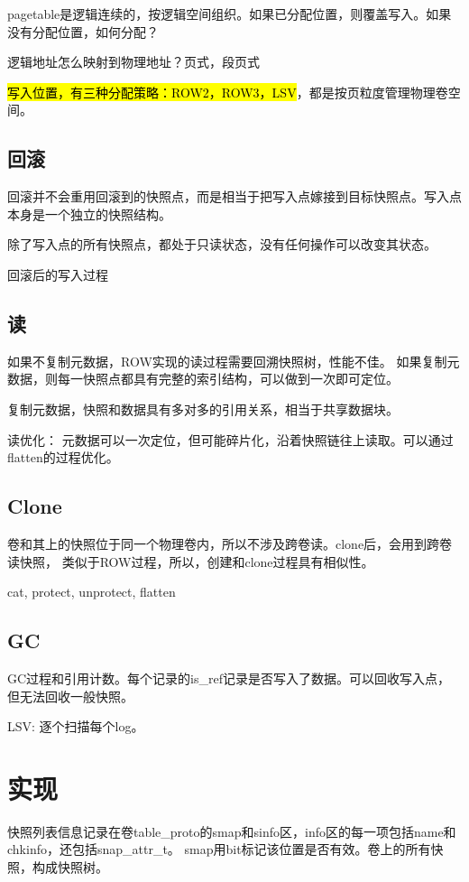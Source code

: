 pagetable是逻辑连续的，按逻辑空间组织。如果已分配位置，则覆盖写入。如果没有分配位置，如何分配？

逻辑地址怎么映射到物理地址？页式，段页式

\hl{写入位置，有三种分配策略：ROW2，ROW3，LSV}，都是按页粒度管理物理卷空间。

\subsection{回滚}

回滚并不会重用回滚到的快照点，而是相当于把写入点嫁接到目标快照点。写入点本身是一个独立的快照结构。

除了写入点的所有快照点，都处于只读状态，没有任何操作可以改变其状态。

回滚后的写入过程

\subsection{读}

如果不复制元数据，ROW实现的读过程需要回溯快照树，性能不佳。
如果复制元数据，则每一快照点都具有完整的索引结构，可以做到一次即可定位。

复制元数据，快照和数据具有多对多的引用关系，相当于共享数据块。

读优化： 元数据可以一次定位，但可能碎片化，沿着快照链往上读取。可以通过flatten的过程优化。

\subsection{Clone}

卷和其上的快照位于同一个物理卷内，所以不涉及跨卷读。clone后，会用到跨卷读快照，
类似于ROW过程，所以，创建和clone过程具有相似性。

cat, protect, unprotect, flatten

\subsection{GC}

GC过程和引用计数。每个记录的is\_ref记录是否写入了数据。可以回收写入点，但无法回收一般快照。

LSV: 逐个扫描每个log。

\section{实现}

快照列表信息记录在卷table\_proto的smap和sinfo区，info区的每一项包括name和chkinfo，还包括snap\_attr\_t。
smap用bit标记该位置是否有效。卷上的所有快照，构成快照树。

